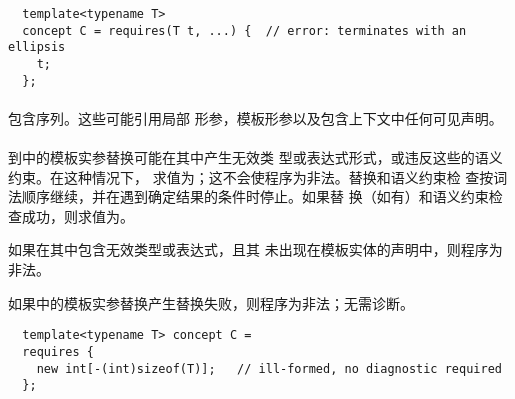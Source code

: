 \begin{example}
  \begin{lstlisting}
  template<typename T>
  concept C = requires(T t, ...) {  // error: terminates with an ellipsis
    t;
  };
  \end{lstlisting}
\end{example}

\paragraph{} %
包含序列。这些可能引用局部
形参，模板形参以及包含上下文中任何可见声明。

\paragraph{} %
到中的模板实参替换可能在其中产生无效类
型或表达式形式，或违反这些的语义约束。在这种情况下，
求值为；这不会使程序为非法。替换和语义约束检
查按词法顺序继续，并在遇到确定结果的条件时停止。如果替
换（如有）和语义约束检查成功，则求值为。

\begin{note}
  如果在其中包含无效类型或表达式，且其
  未出现在模板实体的声明中，则程序为非法。
\end{note}

如果中的模板实参替换产生替换失败，则程序为非法；无需诊断。

\begin{example}
  \begin{lstlisting}
  template<typename T> concept C =
  requires {
    new int[-(int)sizeof(T)];   // ill-formed, no diagnostic required
  };
  \end{lstlisting}
\end{example}
